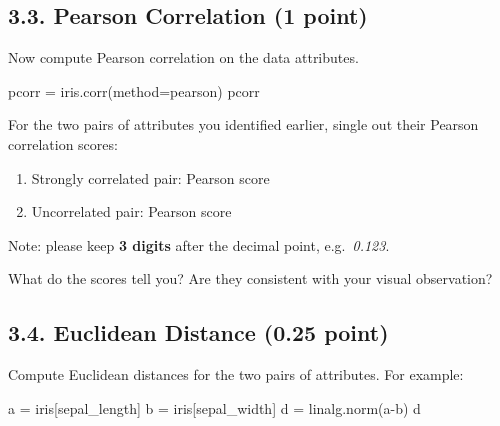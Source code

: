 \documentclass[
  letterpaper,
]{scrbook}
\newenvironment{Shaded}{\begin{snugshade}}{\end{snugshade}}
\newcommand{\NormalTok}[1]{\textcolor[rgb]{0.00,0.23,0.31}{#1}}
\newcommand{\OperatorTok}[1]{\textcolor[rgb]{0.37,0.37,0.37}{#1}}
\newcommand{\StringTok}[1]{\textcolor[rgb]{0.13,0.47,0.30}{#1}}
\providecommand{\tightlist}{%
  \setlength{\itemsep}{0pt}\setlength{\parskip}{0pt}}
\begin{document}
\subsection*{3.3. Pearson Correlation (1
point)}\label{pearson-correlation-1-point}

Now compute Pearson correlation on the data attributes.

\begin{Shaded}
\begin{Highlighting}[]
\NormalTok{pcorr }\OperatorTok{=}\NormalTok{ iris.corr(method}\OperatorTok{=}\StringTok{\textquotesingle{}pearson\textquotesingle{}}\NormalTok{)}
\NormalTok{pcorr}
\end{Highlighting}
\end{Shaded}

For the two pairs of attributes you identified earlier, single out their
Pearson correlation scores:

\begin{enumerate}
\def\labelenumi{\arabic{enumi}.}
\tightlist
\item
  Strongly correlated pair: Pearson score
\item
  Uncorrelated pair: Pearson score
\end{enumerate}

Note: please keep \textbf{3 digits} after the decimal point,
e.g.~\emph{0.123}.

What do the scores tell you? Are they consistent with your visual
observation?

\subsection*{3.4. Euclidean Distance (0.25
point)}\label{euclidean-distance-0.25-point}

Compute Euclidean distances for the two pairs of attributes. For
example:

\begin{Shaded}
\begin{Highlighting}[]
\NormalTok{a }\OperatorTok{=}\NormalTok{ iris[}\StringTok{\textquotesingle{}sepal\_length\textquotesingle{}}\NormalTok{]}
\NormalTok{b }\OperatorTok{=}\NormalTok{ iris[}\StringTok{\textquotesingle{}sepal\_width\textquotesingle{}}\NormalTok{]}
\NormalTok{d }\OperatorTok{=}\NormalTok{ linalg.norm(a}\OperatorTok{{-}}\NormalTok{b)}
\NormalTok{d}
\end{Highlighting}
\end{Shaded}
\end{document}
